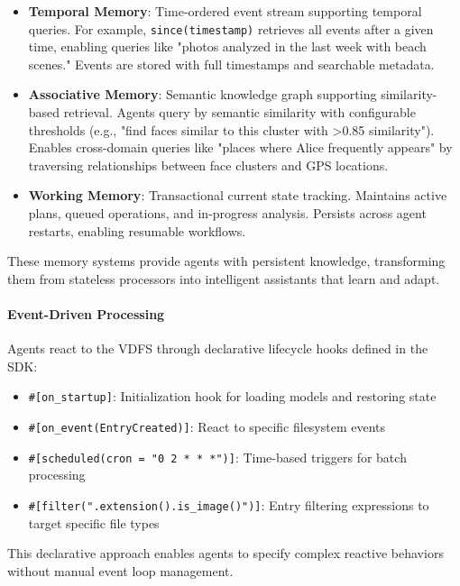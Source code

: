 \documentclass[sigconf]{acmart}
\begin{document}
\begin{itemize}[noitemsep, topsep=0pt]
 \item \textbf{Temporal Memory}: Time-ordered event stream supporting temporal queries. For example, \texttt{since(timestamp)} retrieves all events after a given time, enabling queries like "photos analyzed in the last week with beach scenes." Events are stored with full timestamps and searchable metadata.

 \item \textbf{Associative Memory}: Semantic knowledge graph supporting similarity-based retrieval. Agents query by semantic similarity with configurable thresholds (e.g., "find faces similar to this cluster with >0.85 similarity"). Enables cross-domain queries like "places where Alice frequently appears" by traversing relationships between face clusters and GPS locations.

 \item \textbf{Working Memory}: Transactional current state tracking. Maintains active plans, queued operations, and in-progress analysis. Persists across agent restarts, enabling resumable workflows.
\end{itemize}

These memory systems provide agents with persistent knowledge, transforming them from stateless processors into intelligent assistants that learn and adapt.

\paragraph{Event-Driven Processing}
Agents react to the VDFS through declarative lifecycle hooks defined in the SDK:

\begin{itemize}[noitemsep, topsep=0pt]
 \item \texttt{\#[on\_startup]}: Initialization hook for loading models and restoring state
 \item \texttt{\#[on\_event(EntryCreated)]}: React to specific filesystem events
 \item \texttt{\#[scheduled(cron = "0 2 * * *")]}: Time-based triggers for batch processing
 \item \texttt{\#[filter(".extension().is\_image()")]}: Entry filtering expressions to target specific file types
\end{itemize}

This declarative approach enables agents to specify complex reactive behaviors without manual event loop management.
\end{document}
